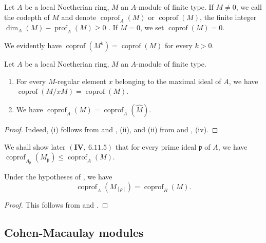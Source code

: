 \begin{definition}[16.4.9]
\label{0.16.4.9}
Let $A$ be a local Noetherian ring, $M$ an $A$-module of finite type.
If $M\neq 0$, we call the codepth of $M$ and denote $\operatorname{coprof}_A(M)$ or $\operatorname{coprof}(M)$, the finite integer $\dim_A(M)-\operatorname{prof}_A(M)\geq 0$ .
If $M=0$, we set $\operatorname{coprof}(M)=0$.
\end{definition}

We evidently have $\operatorname{coprof}(M^k)=\operatorname{coprof}(M)$ for every $k>0$.

\begin{proposition}[16.4.10]
\label{0.16.4.10}
Let $A$ be a local Noetherian ring, $M$ an $A$-module of finite type.
\begin{enumerate}
  \item[\rm{(i)}] For every $M$-regular element $x$ belonging to the maximal ideal of $A$, we have $\operatorname{coprof}(M/x M)=\operatorname{coprof}(M)$.
  \item[\rm{(ii)}] We have $\operatorname{coprof}_A(M)=\operatorname{coprof}_{\widehat{A}}(\widehat{M})$.
\end{enumerate}
\end{proposition}

\begin{proof}
Indeed, (i) follows from  and , (ii), and (ii) from  and , (iv).
\end{proof}

We shall show later $(\mathbf{IV},~6.11.5)$ that for every prime ideal $\mathfrak{p}$ of $A$, we have $\operatorname{coprof}_{A_\mathfrak{p}}(M_\mathfrak{p})\leq\operatorname{coprof}_A(M)$.

\begin{proposition}[16.4.11]
\label{0.16.4.11}
Under the hypotheses of , we have
\begin{equation}
\label{0.16.4.11.1}
\tag{16.4.11.1}
  \operatorname{coprof}_A(M_{[\rho]})=\operatorname{coprof}_B(M).
\end{equation}
\end{proposition}

\begin{proof}
This follows from  and .
\end{proof}

\subsection{Cohen-Macaulay modules}
\label{subsection:0.16.5}


